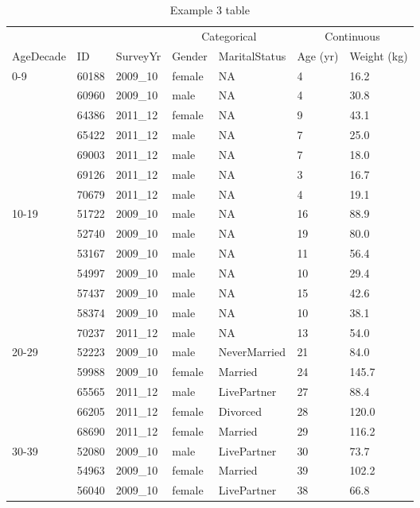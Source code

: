 \documentclass{article}
\begin{document}
\endgroup
\newpage
\hypertarget{Example 3 table}{} 
\begin{table}[H]
\caption{Example 3 table}\label{ex3} \footnotesize\begin{tabular}{p{3cm}llllll}

\hline
\multicolumn{3}{c}{}&\multicolumn{2}{c}{Categorical}&\multicolumn{2}{c}{Continuous} \\
\cmidrule(lr){4-5} \cmidrule(lr){6-7}
AgeDecade & ID & SurveyYr & Gender & MaritalStatus & Age (yr) & Weight (kg)\\
\hline
 0-9 & 60188 & 2009\_10 & female & NA &  4 &  16.2 \\
 & 60960 & 2009\_10 & male & NA &  4 &  30.8 \\
 & 64386 & 2011\_12 & female & NA &  9 &  43.1 \\
 & 65422 & 2011\_12 & male & NA &  7 &  25.0 \\
 & 69003 & 2011\_12 & male & NA &  7 &  18.0 \\
 & 69126 & 2011\_12 & male & NA &  3 &  16.7 \\
 & 70679 & 2011\_12 & male & NA &  4 &  19.1 \\
[2ex]
 10-19 & 51722 & 2009\_10 & male & NA & 16 &  88.9 \\
 & 52740 & 2009\_10 & male & NA & 19 &  80.0 \\
 & 53167 & 2009\_10 & male & NA & 11 &  56.4 \\
 & 54997 & 2009\_10 & male & NA & 10 &  29.4 \\
 & 57437 & 2009\_10 & male & NA & 15 &  42.6 \\
 & 58374 & 2009\_10 & male & NA & 10 &  38.1 \\
 & 70237 & 2011\_12 & male & NA & 13 &  54.0 \\
[2ex]
 20-29 & 52223 & 2009\_10 & male & NeverMarried & 21 &  84.0 \\
 & 59988 & 2009\_10 & female & Married & 24 & 145.7 \\
 & 65565 & 2011\_12 & male & LivePartner & 27 &  88.4 \\
 & 66205 & 2011\_12 & female & Divorced & 28 & 120.0 \\
 & 68690 & 2011\_12 & female & Married & 29 & 116.2 \\
[2ex]
 30-39 & 52080 & 2009\_10 & male & LivePartner & 30 &  73.7 \\
 & 54963 & 2009\_10 & female & Married & 39 & 102.2 \\
 & 56040 & 2009\_10 & female & LivePartner & 38 &  66.8 \\

\end{tabular}
\end{table}
\end{document}
